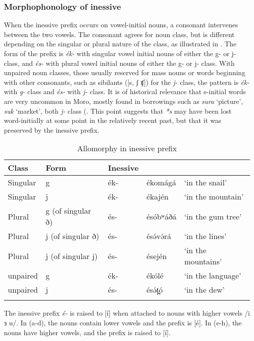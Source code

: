 \subsubsection{Morphophonology of inessive}

When the inessive prefix occurs on vowel-initial nouns, a consonant intervenes between the two vowels. The consonant agrees for noun class, but is different depending on the singular or plural nature of the class, as illustrated in . The form of the prefix is \textit{ék-} with singular vowel initial nouns of either the g- or j- class, and \textit{és-} with plural vowel initial nouns of either the g- or j- class. With unpaired noun classes, those usually reserved for mass nouns or words beginning with other consonants, such as sibilants ([s, ʃ ʧ]) for the \textit{j-} class, the pattern is \textit{ék-} with \textit{g-} class and \textit{és-} with \textit{j-} class. It is of historical relevance that s-initial words are very uncommon in Moro, mostly found in borrowings such as \textit{sura} `picture', \textit{suk} `market', both \textit{j-} class (. This point suggests that \textit{*s} may have been lost word-initially at some point in the relatively recent past, but that it was preserved by the inessive prefix.

\begin{table}
\caption{Allomorphy in inessive prefix}\label{tab:ch6:iness}
\begin{tabular}[t]{lllll}
\lsptoprule
Class	&	Form &	Inessive	\\
\midrule 
Singular& g	&	ék-			&	ékomágá 		&	`in the snail'\\
Singular& j	&	ék-			&	ékajén		&	`in the mountain'\\
Plural	& g (of singular ð)	&	és-			&	ésóbʷáðá&	`in the gum tree'\\
Plural	& j (of singular ð)	&	és-			&	ésə́və́rá	&	`in the lines'\\
Plural	& j (of singular j)	&	és-			&	ésején	&	`in the mountains'\\
unpaired& g	&	ék-			&	ékólé		&	`in the language'\\
unpaired& j	& 	és-  		&	ésə́t̪ó		&	`in the dew'\\
\lspbottomrule
\end{tabular}	
\end{table}


The inessive prefix \textit{é-} is raised to [í] when attached to nouns with higher vowels /i  ɜ u/. In (a-d), the nouns contain lower vowels and the prefix is [é]. In (e-h), the nouns have higher vowels, and the prefix is raised to [í].

